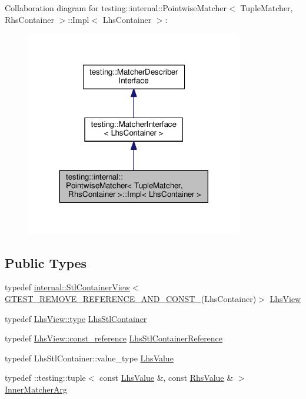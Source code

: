 Collaboration diagram for testing\+:\+:internal\+:\+:Pointwise\+Matcher$<$ Tuple\+Matcher, Rhs\+Container $>$\+:\+:Impl$<$ Lhs\+Container $>$\+:
\nopagebreak
\begin{figure}[H]
\begin{center}
\leavevmode
\includegraphics[width=269pt]{classtesting_1_1internal_1_1PointwiseMatcher_1_1Impl__coll__graph}
\end{center}
\end{figure}
\subsection*{Public Types}
\begin{DoxyCompactItemize}
\item 
typedef \hyperlink{classtesting_1_1internal_1_1StlContainerView}{internal\+::\+Stl\+Container\+View}$<$ \hyperlink{gtest-internal_8h_a874567b176266188fabfffb8393267ce}{G\+T\+E\+S\+T\+\_\+\+R\+E\+M\+O\+V\+E\+\_\+\+R\+E\+F\+E\+R\+E\+N\+C\+E\+\_\+\+A\+N\+D\+\_\+\+C\+O\+N\+S\+T\+\_\+}(Lhs\+Container)$>$ \hyperlink{classtesting_1_1internal_1_1PointwiseMatcher_1_1Impl_a5240abc710bb0a5bedfd180bf6701fae}{Lhs\+View}
\item 
typedef \hyperlink{classtesting_1_1internal_1_1StlContainerView_a2b2c63a6dcdbfe63fb0ee121ebf463ba}{Lhs\+View\+::type} \hyperlink{classtesting_1_1internal_1_1PointwiseMatcher_1_1Impl_a23420b57b4cd6d83cec8afda746c27f2}{Lhs\+Stl\+Container}
\item 
typedef \hyperlink{classtesting_1_1internal_1_1StlContainerView_a9cd4f6ed689b3938cdb7b3c4cbf1b36b}{Lhs\+View\+::const\+\_\+reference} \hyperlink{classtesting_1_1internal_1_1PointwiseMatcher_1_1Impl_a9df3eb0866f76d59dbdd35fafeb5590c}{Lhs\+Stl\+Container\+Reference}
\item 
typedef Lhs\+Stl\+Container\+::value\+\_\+type \hyperlink{classtesting_1_1internal_1_1PointwiseMatcher_1_1Impl_a453769e721f4212e399f76c980b4b65c}{Lhs\+Value}
\item 
typedef \+::testing\+::tuple$<$ const \hyperlink{classtesting_1_1internal_1_1PointwiseMatcher_1_1Impl_a453769e721f4212e399f76c980b4b65c}{Lhs\+Value} \&, const \hyperlink{classtesting_1_1internal_1_1PointwiseMatcher_a9f7f1abbfa795033e1e1c1df385b4617}{Rhs\+Value} \& $>$ \hyperlink{classtesting_1_1internal_1_1PointwiseMatcher_1_1Impl_aba9d983881cbfbb37724b8b40e863898}{Inner\+Matcher\+Arg}
\end{DoxyCompactItemize}
